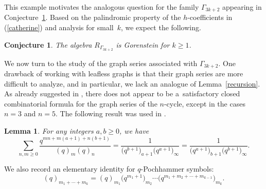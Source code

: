 \documentclass[pdftex]{sigma}
\numberwithin{equation}{section}
\newtheorem{Lemma}[Theorem]{Lemma}
\newtheorem{Conjecture}[Theorem]{Conjecture}
\theoremstyle{definition}
\begin{document}
This example motivates the analogous question for the family $\Gamma_{3k+2}$ appearing in Conjecture~\ref{Conjecture2.4}. Based on the palindromic property of the $h$-coefficients in (\ref{catherine}) and analysis for small~$k$, we expect the following.

\begin{Conjecture}\label{Conjecture2.4} The algebra $R_{\Gamma_{3k+2}}$ is Gorenstein for $k \geq 1$.
\end{Conjecture}

We now turn to the study of the graph series associated with $\Gamma_{3k+2}$.
One drawback of working with leafless graphs is that their graph series are more difficult to analyze, and in particular, we lack an analogue of Lemma~\ref{recursion}.
As already suggested in \cite{BJM}, there does not appear to be a~satisfactory closed combinatorial formula for the graph series of the $n$-cycle, except in the cases $n=3$ and $n=5$.
The following result was used in \cite{BJM}.
\begin{Lemma} \label{double}
For any integers $a,b \geq 0$, we have
\[
\sum_{n,m \geq 0} \frac{q^{mn+m(a+1)+n(b+1)}}{(q)_{m}(q)_n}=\frac{1}{\bigl(q^{b+1}\bigr)_{a+1}\bigl(q^{a+1}\bigr)_{\infty}}
=\frac{1}{\bigl(q^{a+1}\bigr)_{b+1}\bigl(q^{b+1}\bigr)_{\infty}}.
\]
\end{Lemma}
We also record an elementary identity for $q$-Pochhammer symbols:
\begin{equation} \label{poch}
(q)_{m_1+\cdots + m_k}=(q)_{m_1} \bigl(q^{m_1+1}\bigr)_{m_2} \cdots \bigl(q^{m_1+m_2+\cdots + m_{k-1}}\bigr)_{m_k}.
\end{equation}
\end{document}
